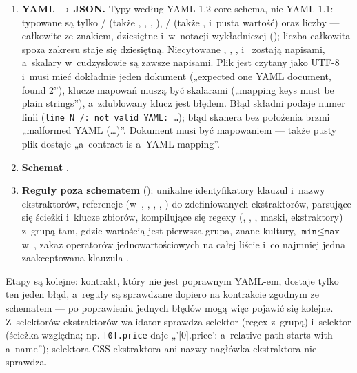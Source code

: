 \begin{enumerate}
  \item \textbf{YAML → JSON.} Typy według YAML 1.2 core schema, nie YAML 1.1: typowane są
        tylko / (także , ,
        , ), /\repopath{\textasciitilde{}}
        (także ,  i~pusta wartość) oraz liczby --- całkowite ze
        znakiem, dziesiętne i~w~notacji wykładniczej (); liczba całkowita spoza
        zakresu  staje się dziesiętną. Niecytowane ,
        , ,  i~ zostają napisami,
        a~skalary w~cudzysłowie są zawsze napisami. Plik jest czytany jako UTF-8 i~musi mieć
        dokładnie jeden dokument („expected one YAML document, found 2”), klucze mapowań muszą
        być skalarami („mapping keys must be plain strings”), a~zdublowany klucz jest błędem.
        Błąd składni podaje numer linii (\texttt{line N /: not valid YAML: …}); błąd skanera bez
        położenia brzmi „malformed YAML (…)”. Dokument musi być mapowaniem --- także pusty plik
        dostaje „a~contract is a~YAML mapping”.
  \item \textbf{Schemat} .
  \item \textbf{Reguły poza schematem} (): unikalne identyfikatory
        klauzul i~nazwy ekstraktorów, referencje  (w~, , , ,
        ) do zdefiniowanych ekstraktorów, parsujące się ścieżki i~klucze
        zbiorów, kompilujące się regexy (, ,
        , maski, ekstraktory) z~grupą tam, gdzie wartością jest pierwsza
        grupa, znane kultury, $\texttt{min} \leq \texttt{max}$ w~, zakaz
        operatorów jednowartościowych na całej liście i~co najmniej jedna zaakceptowana
        klauzula .
\end{enumerate}

Etapy są kolejne: kontrakt, który nie jest poprawnym YAML-em, dostaje tylko ten jeden błąd,
a~reguły  są sprawdzane dopiero na kontrakcie zgodnym ze schematem ---
po poprawieniu jednych błędów mogą więc pojawić się kolejne. Z~selektorów ekstraktorów
walidator sprawdza selektor  (regex z~grupą) i~selektor 
(ścieżka względna; np. \texttt{[0].price} daje „'[0].price': a~relative path starts with
a~name”); selektora CSS ekstraktora  ani nazwy nagłówka ekstraktora
 nie sprawdza.

